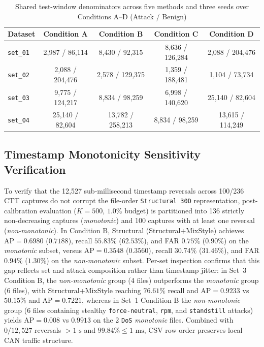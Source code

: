 \documentclass[12pt, a4paper, reqno, oneside]{book}
\DeclareRobustCommand{\code}[1]{\nolinkurl{#1}}
\begin{document}
\begin{table}[htbp]
\centering
\footnotesize
\caption{Shared test-window denominators across five methods and three seeds over Conditions A--D (Attack / Benign)}\label{tab:comparison-counts}
\vspace{2pt}
\begin{tabular}{lcccc}
\toprule
\textbf{Dataset} & \textbf{Condition A} & \textbf{Condition B} & \textbf{Condition C} & \textbf{Condition D} \\
\midrule
\code{set\_01} & 2,987 / 86,114 & 8,430 / 92,315 & 8,636 / 126,284 & 2,088 / 204,476 \\
\code{set\_02} & 2,088 / 204,476 & 2,578 / 129,375 & 1,359 / 188,481 & 1,104 / 73,734 \\
\code{set\_03} & 9,775 / 124,217 & 8,834 / 98,259 & 6,998 / 140,620 & 25,140 / 82,604 \\
\code{set\_04} & 25,140 / 82,604 & 13,782 / 258,213 & 8,834 / 98,259 & 13,615 / 114,249 \\
\bottomrule
\end{tabular}
\end{table}

\subsection{Timestamp Monotonicity Sensitivity Verification}\label{subsec:monotonic-sensitivity}
To verify that the 12,527 sub-millisecond timestamp reversals across 100/236 CTT captures do not corrupt the file-order \code{Structural 30D} representation, post-calibration evaluation ($K=500$, $1.0\%$ budget) is partitioned into 136 strictly non-decreasing captures (\textit{monotonic}) and 100 captures with at least one reversal (\textit{non-monotonic}). In Condition B, Structural (Structural+MixStyle) achieves $\text{AP}=0.6980$ ($0.7188$), recall $55.83\%$ ($62.53\%$), and FAR $0.75\%$ ($0.90\%$) on the \textit{monotonic} subset, versus $\text{AP}=0.3548$ ($0.3560$), recall $30.74\%$ ($31.46\%$), and FAR $0.94\%$ ($1.30\%$) on the \textit{non-monotonic} subset. Per-set inspection confirms that this gap reflects set and attack composition rather than timestamp jitter: in Set~3 Condition B, the \textit{non-monotonic} group (4 files) outperforms the \textit{monotonic} group (6 files), with Structural+MixStyle reaching $76.61\%$ recall and $\text{AP}=0.9233$ vs $50.15\%$ and $\text{AP}=0.7221$, whereas in Set~1 Condition B the \textit{non-monotonic} group (6 files containing stealthy \code{force-neutral}, \code{rpm}, and \code{standstill} attacks) yields $\text{AP}=0.008$ vs $0.9913$ on the 2 \code{DoS} \textit{monotonic} files. Combined with $0/12,527$ reversals $>1\text{ s}$ and $99.84\% \le 1\text{ ms}$, CSV row order preserves local CAN traffic structure.
\end{document}
